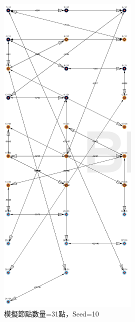 \begin{ZhChapter}
\begin{figure}[H]
    \centering
    \includegraphics[width = 0.6\textwidth]{image/模擬實驗31點seed=10.png}
    \caption{模擬節點數量=31點，Seed=10}
    \label{fig: 模擬實驗31點seed=10}
\end{figure}


\end{ZhChapter}
